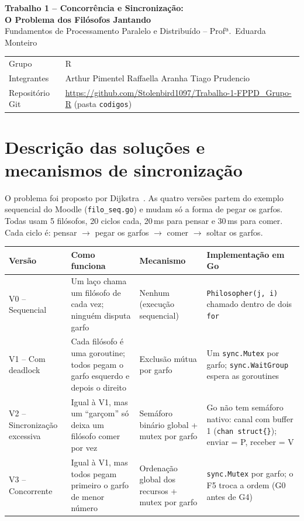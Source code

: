 \documentclass[11pt,a4paper]{article}
\begin{document}
\begin{center}
  {\Large\bfseries Trabalho 1 -- Concorrência e Sincronização:\\[2pt]
  O Problema dos Filósofos Jantando}\\[6pt]
  Fundamentos de Processamento Paralelo e Distribuído -- Profª.\ Eduarda Monteiro\\[2pt]
\end{center}

\begin{tabularx}{\textwidth}{@{}lY@{}}
\toprule
Grupo & R \\
Integrantes & Arthur Pimentel \textperiodcentered{} Raffaella Aranha \textperiodcentered{} Tiago Prudencio \\
Repositório Git & \url{https://github.com/Stolenbird1097/Trabalho-1-FPPD_Grupo-R} (pasta \texttt{codigos}) \\
\bottomrule
\end{tabularx}

\section*{Descrição das soluções e mecanismos de sincronização}

O problema foi proposto por Dijkstra~\cite{dijkstra1971,tanenbaum2014}. As quatro versões partem do exemplo sequencial do Moodle (\texttt{filo\_seq.go}) e mudam
só a forma de pegar os garfos. Todas usam 5 filósofos, 20 ciclos cada, 20\,ms para pensar
e 30\,ms para comer. Cada ciclo é: pensar $\rightarrow$ pegar os garfos $\rightarrow$ comer
$\rightarrow$ soltar os garfos.

{\small
\begin{tabularx}{\textwidth}{@{}>{\raggedright\arraybackslash}p{2.6cm}YYY@{}}
\toprule
\textbf{Versão} & \textbf{Como funciona} & \textbf{Mecanismo} & \textbf{Implementação em Go} \\
\midrule
V0 -- Sequencial & Um laço chama um filósofo de cada vez; ninguém disputa garfo &
  Nenhum (execução sequencial) & \texttt{Philosopher(j, i)} chamado dentro de dois \texttt{for} \\
\addlinespace
V1 -- Com deadlock & Cada filósofo é uma goroutine; todos pegam o garfo esquerdo e depois o direito &
  Exclusão mútua por garfo & Um \texttt{sync.Mutex} por garfo; \texttt{sync.WaitGroup} espera as goroutines \\
\addlinespace
V2 -- Sincronização excessiva & Igual à V1, mas um ``garçom'' só deixa um filósofo comer por vez &
  Semáforo binário global + mutex por garfo &
  Go não tem semáforo nativo: canal com buffer 1 (\texttt{chan struct\{\}}); enviar = P, receber = V \\
\addlinespace
V3 -- Concorrente & Igual à V1, mas todos pegam primeiro o garfo de menor número &
  Ordenação global dos recursos + mutex por garfo & \texttt{sync.Mutex} por garfo; o F5 troca a ordem (G0 antes de G4) \\
\bottomrule
\end{tabularx}
}
\end{document}
